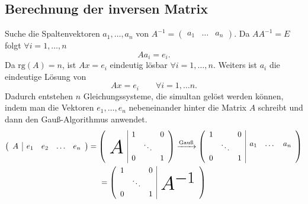 \subsection*{Berechnung der inversen Matrix}
Suche die Spaltenvektoren $a_1,\dots,a_n$ von $A^{-1} = \begin{pmatrix}
    a_1 & \dots & a_n
\end{pmatrix}$. Da $AA^{-1}= E$ folgt $\forall i=1,\dots,n$
\[
    Aa_i=e_i
.\]
Da $\text{rg}(A) = n$, ist $Ax = e_i$ eindeutig lösbar $\forall i = 1,\dots, n$. Weiters ist $a_i$ die eindeutige
Lösung von 
\[
    Ax = e_i\qquad\forall i=1,\dots n.
\]
Dadurch entstehen $n$ Gleichungssysteme, die simultan gelöst werden können, indem man die Vektoren $e_1, \dots, e_n$
nebeneinander hinter die Matrix $A$ schreibt und dann den Gauß-Algorithmus anwendet.
\begin{multline*}    
    \left(
        \begin{array}{c | c c c c}
            A & e_1 & e_2 & \dots & e_n
        \end{array}
    \right) = \left(\begin{array}{c | c c c}
        \multirow{4}{*}{\Huge$A$} & 1 & & 0\\
        & & \ddots &\\
        & 0 & & 1
    \end{array}\right) \xrightarrow[]{\text{Gauß}}
    \left(
        \begin{array}{c c c | c c c}
            1 & & 0 & \multirow{3}{*}{$a_1$} & \multirow{3}{*}{$\dots$} & \multirow{3}{*}{$a_n$}\\
              & \ddots &\\
            0 & & 1
        \end{array}
    \right)\\
    =\left(
        \begin{array}{ccc|r}
            1 & & 0 & \multirow{4}{*}{\Huge$A^{-1}$}\\
              & \ddots &\\
            0 & & 1 &
        \end{array}
    \right)
\end{multline*}
